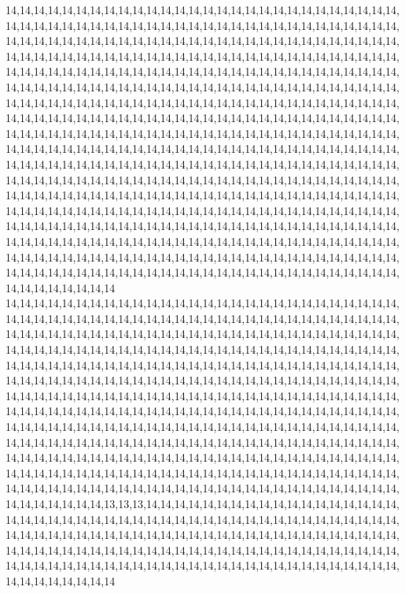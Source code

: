 14,14,14,14,14,14,14,14,14,14,14,14,14,14,14,14,14,14,14,14,14,14,14,14,14,14,14,14,14,14,14,14,14,14,14,14,14,14,14,14,14,14,14,14,14,14,14,14,14,14,14,14,14,14,14,14,14,14,14,14,14,14,14,14,14,14,14,14,14,14,14,14,14,14,14,14,14,14,14,14,14,14,14,14,14,14,14,14,14,14,14,14,14,14,14,14,14,14,14,14,14,14,14,14,14,14,14,14,14,14,14,14,14,14,14,14,14,14,14,14,14,14,14,14,14,14,14,14,14,14,14,14,14,14,14,14,14,14,14,14,14,14,14,14,14,14,14,14,14,14,14,14,14,14,14,14,14,14,14,14,14,14,14,14,14,14,14,14,14,14,14,14,14,14,14,14,14,14,14,14,14,14,14,14,14,14,14,14,14,14,14,14,14,14,14,14,14,14,14,14,14,14,14,14,14,14,14,14,14,14,14,14,14,14,14,14,14,14,14,14,14,14,14,14,14,14,14,14,14,14,14,14,14,14,14,14,14,14,14,14,14,14,14,14,14,14,14,14,14,14,14,14,14,14,14,14,14,14,14,14,14,14,14,14,14,14,14,14,14,14,14,14,14,14,14,14,14,14,14,14,14,14,14,14,14,14,14,14,14,14,14,14,14,14,14,14,14,14,14,14,14,14,14,14,14,14,14,14,14,14,14,14,14,14,14,14,14,14,14,14,14,14,14,14,14,14,14,14,14,14,14,14,14,14,14,14,14,14,14,14,14,14,14,14,14,14,14,14,14,14,14,14,14,14,14,14,14,14,14,14,14,14,14,14,14,14,14,14,14,14,14,14,14,14,14,14,14,14,14,14,14,14,14,14,14,14,14,14,14,14,14,14,14,14,14,14,14,14,14,14,14,14,14,14,14,14,14,14,14,14,14,14,14,14,14,14,14,14,14,14,14,14,14,14,14,14,14,14,14,14,14,14,14,14,14,14,14,14,14,14,14,14,14,14,14,14,14,14,14,14,14,14,14,14,14,14,14,14,14,14,14,14,14,14,14,14,14,14,14,14,14,14,14,14,14,14,14,14,14,14,14,14,14,14,14,14,14,14,14,14,14,14,14,14,14,14,14,14,14,14,14,14,14,14,14,14,14,14,14,14,14,14
14,14,14,14,14,14,14,14,14,14,14,14,14,14,14,14,14,14,14,14,14,14,14,14,14,14,14,14,14,14,14,14,14,14,14,14,14,14,14,14,14,14,14,14,14,14,14,14,14,14,14,14,14,14,14,14,14,14,14,14,14,14,14,14,14,14,14,14,14,14,14,14,14,14,14,14,14,14,14,14,14,14,14,14,14,14,14,14,14,14,14,14,14,14,14,14,14,14,14,14,14,14,14,14,14,14,14,14,14,14,14,14,14,14,14,14,14,14,14,14,14,14,14,14,14,14,14,14,14,14,14,14,14,14,14,14,14,14,14,14,14,14,14,14,14,14,14,14,14,14,14,14,14,14,14,14,14,14,14,14,14,14,14,14,14,14,14,14,14,14,14,14,14,14,14,14,14,14,14,14,14,14,14,14,14,14,14,14,14,14,14,14,14,14,14,14,14,14,14,14,14,14,14,14,14,14,14,14,14,14,14,14,14,14,14,14,14,14,14,14,14,14,14,14,14,14,14,14,14,14,14,14,14,14,14,14,14,14,14,14,14,14,14,14,14,14,14,14,14,14,14,14,14,14,14,14,14,14,14,14,14,14,14,14,14,14,14,14,14,14,14,14,14,14,14,14,14,14,14,14,14,14,14,14,14,14,14,14,14,14,14,14,14,14,14,14,14,14,14,14,14,14,14,14,14,14,14,14,14,14,14,14,14,14,14,14,14,14,14,14,14,14,14,14,14,14,14,14,14,14,14,14,14,14,14,14,14,14,14,14,14,14,14,14,14,14,14,14,14,14,14,14,14,14,14,14,14,14,14,14,14,14,14,14,14,14,14,14,14,14,14,13,13,13,14,14,14,14,14,14,14,14,14,14,14,14,14,14,14,14,14,14,14,14,14,14,14,14,14,14,14,14,14,14,14,14,14,14,14,14,14,14,14,14,14,14,14,14,14,14,14,14,14,14,14,14,14,14,14,14,14,14,14,14,14,14,14,14,14,14,14,14,14,14,14,14,14,14,14,14,14,14,14,14,14,14,14,14,14,14,14,14,14,14,14,14,14,14,14,14,14,14,14,14,14,14,14,14,14,14,14,14,14,14,14,14,14,14,14,14,14,14,14,14,14,14,14,14,14,14,14,14,14,14,14,14,14,14,14,14,14,14

